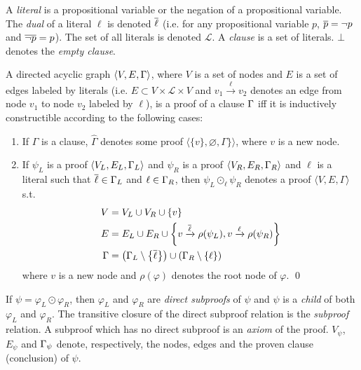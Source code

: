 \documentclass{llncs}
\begin{document}
A \emph{literal} is a propositional variable or the negation of a propositional variable. The
\emph{dual} of a literal $\ell$ is denoted $\overline{\ell}$ (i.e. for any propositional variable $p$,
$\overline{p} = \neg p$ and $\overline{\neg p} = p$). The set of all literals is denoted $\mathcal{L}$. A
\emph{clause} is a set of literals. $\bot$ denotes the \emph{empty clause}.


\newcommand{\axiom}[1]{\widehat{#1}}
\newcommand{\n}{v}
\newcommand{\raiz}[1]{\rho(#1)}

\begin{definition}[Proof] 
\label{def:proof}
A directed acyclic graph $\langle V, E, \Gamma \rangle$, where $V$ is a set of nodes and $E$ is a
set of edges labeled by literals (i.e. $E \subset V \times \mathcal{L} \times V$ and $\n_1
\xrightarrow{\ell} \n_2$ denotes an edge from node $\n_1$ to node $\n_2$ labeled by $\ell$), is a
proof of a clause $\Gamma$ iff it is inductively constructible according to the following cases:
%
\begin{enumerate}
  \item If $\Gamma$ is a clause, $\axiom{\Gamma}$ denotes some proof $\langle \{ \n \}, \varnothing,
    \Gamma \} \rangle$, where $\n$ is a new node.
  \item If $\psi_L$ is a proof $\langle V_L, E_L, \Gamma_L \rangle$ and
    $\psi_R$ is a proof $\langle V_R, E_R, \Gamma_R \rangle$ and $\ell$ is a literal such that
    $\overline{\ell} \in \Gamma_L$ and $\ell \in \Gamma_R$, then
    $\psi_L \odot_\ell \psi_R$ denotes a proof $\langle V, E, \Gamma \rangle$ s.t.
    \begin{align*}
      V &= V_L \cup V_R \cup \{\n \} \\
      E &= E_L \cup E_R \cup
                    \left\{ \n \xrightarrow{\dual{\ell}} \raiz{\psi_L}, \n \xrightarrow{\ell} \raiz{\psi_R} \right\} \\
     \Gamma &= \left( \clause_L \setminus \left\{ \dual{\ell} \right\} \right) \cup \left( \clause_R
                    \setminus \left\{ \ell \right\} \right)
    \end{align*}
    where $\n$ is a new node and $\raiz{\varphi}$ denotes the root node of $\varphi$.
  \qed
\end{enumerate}
\end{definition}


\newcommand{\Vertices}[1]{V_{#1}}
\newcommand{\Edges}[1]{E_{#1}}
\newcommand{\Conclusion}[1]{\clause_{#1}}

\noindent
If $\psi = \varphi_L \odot \varphi_R$, then $\varphi_L$ and $\varphi_R$ are \emph{direct subproofs}
of $\psi$ and $\psi$ is a \emph{child} of both $\varphi_L$ and $\varphi_R$. The transitive closure of
the direct subproof relation is the \emph{subproof} relation. A subproof which has no direct
subproof is an \emph{axiom} of the proof.
%
$\Vertices{\psi}$, $\Edges{\psi}$ and $\Conclusion{\psi}$
denote, respectively, the nodes, edges and the proven clause (conclusion) of $\psi$.
\end{document}
